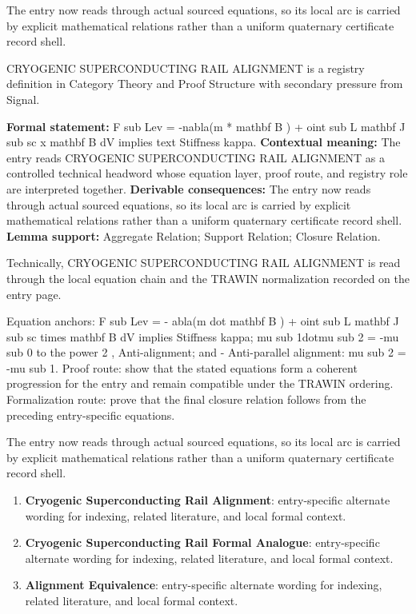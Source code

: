 The entry now reads through actual sourced equations, so its local arc is carried by explicit mathematical relations rather than a uniform quaternary certificate record shell.
\clearpage


\begingroup\small
{}
CRYOGENIC SUPERCONDUCTING RAIL ALIGNMENT is a registry definition in Category Theory and Proof Structure with secondary pressure from Signal.

\begingroup\footnotesize\setlength{\emergencystretch}{3em}\sloppy
\textbf{Formal statement:} F sub Lev = -nabla(m * mathbf B ) + oint sub L mathbf J sub sc x mathbf B dV implies text Stiffness kappa. \textbf{Contextual meaning:} The entry reads CRYOGENIC SUPERCONDUCTING RAIL ALIGNMENT as a controlled technical headword whose equation layer, proof route, and registry role are interpreted together. \textbf{Derivable consequences:} The entry now reads through actual sourced equations, so its local arc is carried by explicit mathematical relations rather than a uniform quaternary certificate record shell. \textbf{Lemma support:} Aggregate Relation; Support Relation; Closure Relation.\par
\endgroup

Technically, CRYOGENIC SUPERCONDUCTING RAIL ALIGNMENT is read through the local equation chain and the TRAWIN normalization recorded on the entry page.

Equation anchors: F sub Lev = - abla(m dot mathbf B ) + oint sub L mathbf J sub sc times mathbf B dV implies Stiffness kappa; mu sub 1dotmu sub 2 = -mu sub 0 to the power 2 , Anti-alignment; and - Anti-parallel alignment: mu sub 2 = -mu sub 1. Proof route: show that the stated equations form a coherent progression for the entry and remain compatible under the TRAWIN ordering. Formalization route: prove that the final closure relation follows from the preceding entry-specific equations.

The entry now reads through actual sourced equations, so its local arc is carried by explicit mathematical relations rather than a uniform quaternary certificate record shell.
\endgroup

\begin{enumerate}[leftmargin=1.6em,itemsep=6pt,topsep=4pt]
\item \textbf{Cryogenic Superconducting Rail Alignment}: entry-specific alternate wording for indexing, related literature, and local formal context.
\item \textbf{Cryogenic Superconducting Rail Formal Analogue}: entry-specific alternate wording for indexing, related literature, and local formal context.
\item \textbf{Alignment Equivalence}: entry-specific alternate wording for indexing, related literature, and local formal context.
\end{enumerate}

